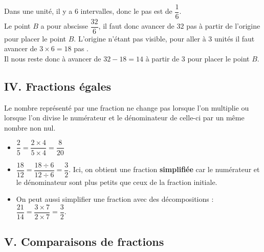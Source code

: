 \begin{Exemples}
\begin{enumerate}
 \\
Dans une unité, il y a $6$ intervalles, donc le pas est de $\dfrac{1}{6}$.\\Le point $B$ a pour abscisse $\dfrac{32}{6}$, il faut donc avancer de $32$ pas à partir de l'origine pour placer le point $B$. L'origine n'étant pas visible, pour aller à $3$ unités il faut avancer de $3 \times 6 =18$ pas . \\Il nous reste donc à avancer de $32 - 18 = 14$ à partir de $3$ pour placer le point $B$.
\end{enumerate}
\end{Exemples}

\vspace{0.8cm}
\subsection*{IV. Fractions égales}

\begin{Propriété}
Le nombre représenté par une fraction ne change pas lorsque l'on multiplie ou lorsque l'on divise le numérateur et le dénominateur de celle-ci par un même nombre non nul.
\end{Propriété}


\begin{Exemples}
\begin{itemize}[label=\textcolor{Couleur8}{$\bullet$}]
\item $\dfrac{2}{5}= \dfrac{2 \times 4}{5 \times 4} = \dfrac{8}{20}$

\item $ \dfrac{18}{12} = \dfrac{18 \div 6}{12 \div 6} = \dfrac{3}{2}$. Ici, on obtient une fraction \textbf{simplifiée} car le numérateur et le dénominateur sont plus petits que ceux de la fraction initiale.

\item On peut aussi simplifier une fraction avec des décompositions : $ \dfrac{21}{14} = \dfrac{3 \times 7}{2 \times 7} = \dfrac{3}{2}$.
\end{itemize}
\end{Exemples}


\newpage

\subsection*{V. Comparaisons de fractions}



